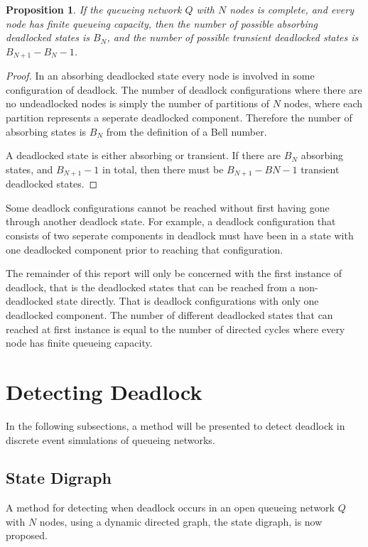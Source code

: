 \documentclass{article}
\newtheorem{proposition}{Proposition}
\begin{document}
\begin{proposition}
  If the queueing network $Q$ with $N$ nodes is complete, and every node has finite queueing capacity, then the number of possible absorbing deadlocked states is $B_N$, and the number of possible transient deadlocked states is $B_{N+1}-B_N-1$.
\end{proposition}

\begin{proof}
In an absorbing deadlocked state every node is involved in some configuration of deadlock.
The number of deadlock configurations where there are no undeadlocked nodes is simply the number of partitions of $N$ nodes, where each partition represents a seperate deadlocked component.
Therefore the number of absorbing states is $B_N$ from the definition of a Bell number.

A deadlocked state is either absorbing or transient.
If there are $B_N$ absorbing states, and $B_{N+1}-1$ in total, then there must be $B_{N+1}-B{N}-1$ transient deadlocked states.
\end{proof}

Some deadlock configurations cannot be reached without first having gone through another deadlock state.
For example, a deadlock configuration that consists of two seperate components in deadlock must have been in a state with one deadlocked component prior to reaching that configuration.

The remainder of this report will only be concerned with the first instance of deadlock, that is the deadlocked states that can be reached from a non-deadlocked state directly.
That is deadlock configurations with only one deadlocked component.
The number of different deadlocked states that can reached at first instance is equal to the number of directed cycles where every node has finite queueing capacity.

\section{Detecting Deadlock}\label{sec:detectdeadlock}
In the following subsections, a method will be presented to detect deadlock in discrete event simulations of queueing networks.

\subsection{State Digraph}

A method for detecting when deadlock occurs in an open queueing network $Q$ with $N$ nodes, using a dynamic directed graph, the state digraph, is now proposed.
\end{document}

